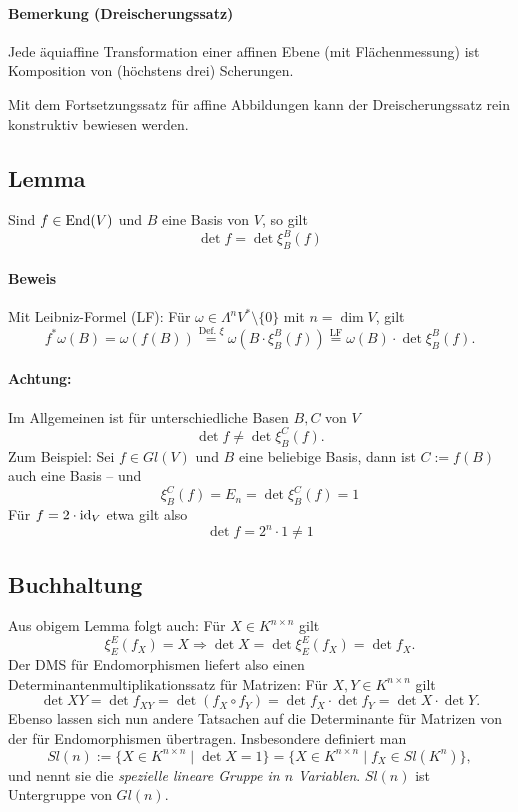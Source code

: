 \paragraph{Bemerkung (Dreischerungssatz)}
	Jede äquiaffine Transformation einer affinen Ebene (mit Flächenmessung) ist Komposition von (höchstens drei) Scherungen.
	
	Mit dem Fortsetzungssatz für affine Abbildungen kann der Dreischerungssatz rein konstruktiv bewiesen werden.
\subsection{Lemma}
	Sind $ f\in \operatorname{End}(V) $ und $ B $ eine Basis von $ V $, so gilt
		\[ \det f = \det \xi_B^B(f) \]
\paragraph{Beweis}
	Mit Leibniz-Formel (LF): Für $ \omega\in \Lambda^nV^*\setminus\{0\} $ mit $ n=\dim V $, gilt
		\[ f^*\omega(B) = \omega(f(B)) \overset{\text{Def. }\xi}{=} \omega(B\cdot \xi_B^B(f))
		\overset{\text{LF}}{=} \omega(B)\cdot \det \xi_B^B(f).\]
\paragraph{Achtung:}
	Im Allgemeinen ist für unterschiedliche Basen $ B,C $ von $ V $
		\[ \det f \neq \det \xi_B^C(f). \]
	Zum Beispiel: Sei $ f\in Gl(V) $ und $ B $ eine beliebige Basis, dann ist $ C:=f(B) $ auch eine Basis -- und 
		\[ \xi_B^C(f) = E_n = \det \xi_B^C(f) = 1 \]
	Für $ f=2\cdot \operatorname{id}_V $ etwa gilt also
		\[ \det f = 2^n \cdot 1\neq 1 \]
\subsection{Buchhaltung}
	Aus obigem Lemma folgt auch:
	Für $ X\in K^{n\times n} $ gilt
		\[ \xi_E^E(f_X) = X \Rightarrow \det X = \det \xi_E^E(f_X) = \det f_X. \]
	Der DMS für Endomorphismen liefert also einen Determinantenmultiplikationssatz für Matrizen: Für $ X,Y\in K^{n\times n} $ gilt
		\[ \det XY = \det f_{XY} = \det(f_X\circ f_Y) = \det f_X\cdot \det f_Y = \det X\cdot \det Y. \]
	Ebenso lassen sich nun andere Tatsachen auf die Determinante für Matrizen von der für Endomorphismen übertragen. Insbesondere definiert man
		\[ Sl(n) := \{X\in K^{n\times n}\mid \det X=1 \} = \{X\in K^{n\times n}\mid f_X\in Sl(K^n)\}, \]
	und nennt sie die \emph{spezielle lineare Gruppe in $n$ Variablen}. $ Sl(n) $ ist Untergruppe von $ Gl(n) $.
